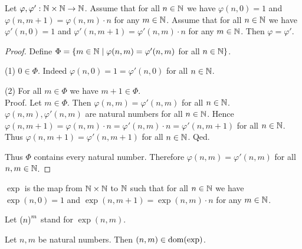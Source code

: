\documentclass[../arithmetic.tex]{subfiles}
\begin{document}
  \begin{forthel}
    \begin{lemma}
      Let $\varphi, \varphi' : \mathbb{N} \times \mathbb{N} \to \mathbb{N}$.
      Assume that for all $n \in \mathbb{N}$ we have $\varphi(n, 0) = 1$ and
      $\varphi(n, m \plus 1) = \varphi(n,m) \cdot n$ for any $m \in \mathbb{N}$.
      Assume that for all $n \in \mathbb{N}$ we have $\varphi'(n, 0) = 1$ and
      $\varphi'(n, m \plus 1) = \varphi'(n,m) \cdot n$ for any $m \in \mathbb{N}$.
      Then $\varphi = \varphi'$.
    \end{lemma}
    \begin{proof}
      Define $\Phi = \{ m \in \mathbb{N} \mid \varphi(n,m) = \varphi'(n,m)$ for
      all $n \in \mathbb{N} \}$.

      (1) $0 \in \Phi$.
      Indeed $\varphi(n,0) = 1 = \varphi'(n,0)$ for all $n \in \mathbb{N}$.

      (2) For all $m \in \Phi$ we have $m \plus 1 \in \Phi$. \\
      Proof.
        Let $m \in \Phi$.
        Then $\varphi(n,m) = \varphi'(n,m)$ for all $n \in \mathbb{N}$.
        $\varphi(n,m), \varphi'(n,m)$ are natural numbers for all $n \in \mathbb{N}$. %
        Hence $\varphi(n, m \plus 1)
          = \varphi(n,m) \cdot n
          = \varphi'(n,m) \cdot n
          = \varphi'(n, m \plus 1)$
        for all $n \in \mathbb{N}$.
        Thus $\varphi(n,m \plus 1) = \varphi'(n,m \plus 1)$ for all $n \in \mathbb{N}$.
      Qed.

      Thus $\Phi$ contains every natural number.
      Therefore $\varphi(n,m) = \varphi'(n,m)$ for all $n, m \in \mathbb{N}$.
    \end{proof}
  \end{forthel}

  \begin{forthel}
    \begin{definition}
      $\exp$ is the map from $\mathbb{N} \times \mathbb{N}$ to $\mathbb{N}$ such that for all
      $n \in \mathbb{N}$ we have $\exp(n, 0) = 1$ and $\exp(n, m \plus 1) =
      \exp(n, m) \cdot n$ for any $m \in \mathbb{N}$.
    \end{definition}

    Let $\left(n\right)^{m}$ stand for $\exp(n,m)$.
  \end{forthel}

  \begin{forthel}
    \begin{lemma}
      Let $n, m$ be natural numbers.
      Then $(n,m) \in \operatorname{dom}(\mathrm{exp})$.
    \end{lemma}
  \end{forthel}
\end{document}
